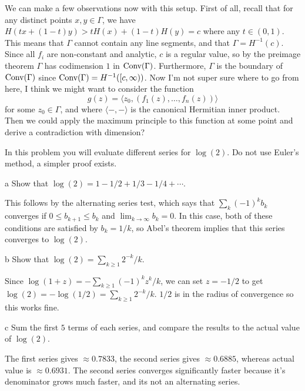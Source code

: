 \documentclass{pset}
\begin{document}
\begin{parts}
    We can make a few observations now with this setup. First of all, recall that for any distinct points $x,y\in \Gamma$, we have $H(tx+(1-t)y) > tH(x)+(1-t)H(y) = c$ where any $t\in (0,1)$. This means that $\Gamma$ cannot contain any line segments, and that $\Gamma = H^{-1}(c)$. Since all $f_i$ are non-constant and analytic, $c$ is a regular value, so by the preimage theorem $\Gamma$ has codimension $1$ in $\textrm{Conv}(\Gamma)$. Furthermore, $\Gamma$ is the boundary of $\textrm{Conv}(\Gamma)$ since $\textrm{Conv}(\Gamma) = H^{-1}([c, \infty))$. Now I'm not super sure where to go from here, I think we might want to consider the function 
    \[
        g(z) = \big\langle z_0, (f_1(z), \ldots, f_n(z)) \big\rangle
    \]
    for some $z_0\in \Gamma$, and where $\big\langle -, - \big\rangle$ is the canonical Hermitian inner product. Then we could apply the maximum principle to this function at some point and derive a contradiction with dimension?
\end{parts}

\begin{problem}{8}
    In this problem you will evaluate different series for $\log(2)$. Do not use Euler's method, a simpler proof exists.
\end{problem}

\begin{parts}
    \begin{part}{a}
        Show that $\log(2) = 1 - 1 /2 + 1 /3 - 1 /4 +\cdots$.
    \end{part}

    This follows by the alternating series test, which says that $\sum_k (-1)^kb_k$ converges if $0\leq b_{k+1}\leq b_k$ and $\lim_{k\to \infty} b_k=0$. In this case, both of these conditions are satisfied by $b_k=1 /k$, so Abel's theorem implies that this series converges to $\log(2)$.

    \begin{part}{b}
        Show that $\log(2)=\sum_{k\geq 1} 2^{-k} / k$.
    \end{part}
    
    Since $\log(1+z)=-\sum_{k\geq 1}(-1)^{k}z^k / k$, we can set $z=-1 /2$ to get $\log(2)=-\log(1 /2) = \sum_{k\geq 1}2^{-k} / k$. $1/2$ is in the radius of convergence so this works fine.

    \begin{part}{c}
        Sum the first $5$ terms of each series, and compare the results to the actual value of $\log(2)$.
    \end{part}

    The first series gives $\approx 0.7833$, the second series gives $\approx 0.6885$, whereas actual value is $\approx 0.6931$. The second series converges significantly faster because it's denominator grows much faster, and its not an alternating series.
\end{parts}
\end{document}
